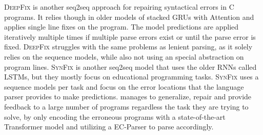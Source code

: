 \textsc{DeepFix} \citep{Gupta2017} is another seq2seq approach for repairing
syntactical errors in \textsc{C} programs. It relies though in older models of
stacked GRUs with Attention and applies single line fixes on the program. The
model predictions are applied iteratively multiple times if multiple parse
errors exist or until the parse error is fixed. \textsc{DeepFix} struggles with
the same problems as lenient parsing, as it solely relies on the sequence
models, while also not using an special abstraction on program lines.
\textsc{SynFix} \citep{Bhatia2016} is another seq2seq model that uses the older
RNNs called LSTMs, but they mostly focus on educational programming tasks.
\textsc{SynFix} uses a sequence models per task and focus on the error locations
that the language parser provides to make predictions. \toolname manages to
generalize, repair and provide feedback to a large number of programs regardless
the task they are trying to solve, by only encoding the erroneous programs with
a state-of-the-art Transformer model and utilizing a EC-Parser to parse
accordingly.




